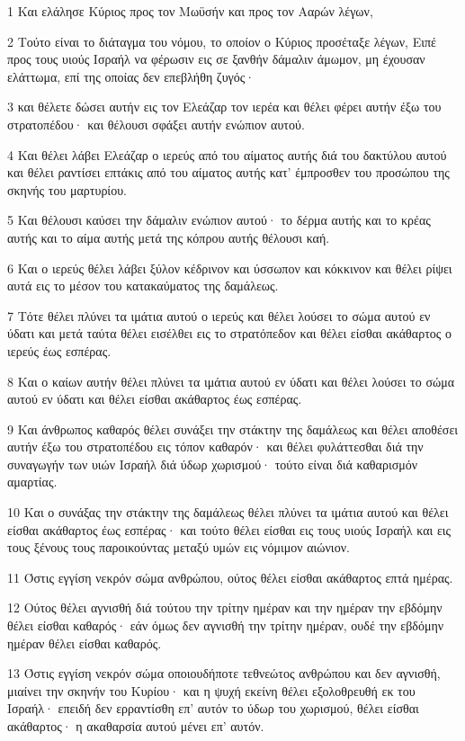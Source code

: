 \par 1 Και ελάλησε Κύριος προς τον Μωϋσήν και προς τον Ααρών λέγων,
\par 2 Τούτο είναι το διάταγμα του νόμου, το οποίον ο Κύριος προσέταξε λέγων, Ειπέ προς τους υιούς Ισραήλ να φέρωσιν εις σε ξανθήν δάμαλιν άμωμον, μη έχουσαν ελάττωμα, επί της οποίας δεν επεβλήθη ζυγός·
\par 3 και θέλετε δώσει αυτήν εις τον Ελεάζαρ τον ιερέα και θέλει φέρει αυτήν έξω του στρατοπέδου· και θέλουσι σφάξει αυτήν ενώπιον αυτού.
\par 4 Και θέλει λάβει Ελεάζαρ ο ιερεύς από του αίματος αυτής διά του δακτύλου αυτού και θέλει ραντίσει επτάκις από του αίματος αυτής κατ' έμπροσθεν του προσώπου της σκηνής του μαρτυρίου.
\par 5 Και θέλουσι καύσει την δάμαλιν ενώπιον αυτού· το δέρμα αυτής και το κρέας αυτής και το αίμα αυτής μετά της κόπρου αυτής θέλουσι καή.
\par 6 Και ο ιερεύς θέλει λάβει ξύλον κέδρινον και ύσσωπον και κόκκινον και θέλει ρίψει αυτά εις το μέσον του κατακαύματος της δαμάλεως.
\par 7 Τότε θέλει πλύνει τα ιμάτια αυτού ο ιερεύς και θέλει λούσει το σώμα αυτού εν ύδατι και μετά ταύτα θέλει εισέλθει εις το στρατόπεδον και θέλει είσθαι ακάθαρτος ο ιερεύς έως εσπέρας.
\par 8 Και ο καίων αυτήν θέλει πλύνει τα ιμάτια αυτού εν ύδατι και θέλει λούσει το σώμα αυτού εν ύδατι και θέλει είσθαι ακάθαρτος έως εσπέρας.
\par 9 Και άνθρωπος καθαρός θέλει συνάξει την στάκτην της δαμάλεως και θέλει αποθέσει αυτήν έξω του στρατοπέδου εις τόπον καθαρόν· και θέλει φυλάττεσθαι διά την συναγωγήν των υιών Ισραήλ διά ύδωρ χωρισμού· τούτο είναι διά καθαρισμόν αμαρτίας.
\par 10 Και ο συνάξας την στάκτην της δαμάλεως θέλει πλύνει τα ιμάτια αυτού και θέλει είσθαι ακάθαρτος έως εσπέρας· και τούτο θέλει είσθαι εις τους υιούς Ισραήλ και εις τους ξένους τους παροικούντας μεταξύ υμών εις νόμιμον αιώνιον.
\par 11 Όστις εγγίση νεκρόν σώμα ανθρώπου, ούτος θέλει είσθαι ακάθαρτος επτά ημέρας.
\par 12 Ούτος θέλει αγνισθή διά τούτου την τρίτην ημέραν και την ημέραν την εβδόμην θέλει είσθαι καθαρός· εάν όμως δεν αγνισθή την τρίτην ημέραν, ουδέ την εβδόμην ημέραν θέλει είσθαι καθαρός.
\par 13 Όστις εγγίση νεκρόν σώμα οποιουδήποτε τεθνεώτος ανθρώπου και δεν αγνισθή, μιαίνει την σκηνήν του Κυρίου· και η ψυχή εκείνη θέλει εξολοθρευθή εκ του Ισραήλ· επειδή δεν ερραντίσθη επ' αυτόν το ύδωρ του χωρισμού, θέλει είσθαι ακάθαρτος· η ακαθαρσία αυτού μένει επ' αυτόν.

